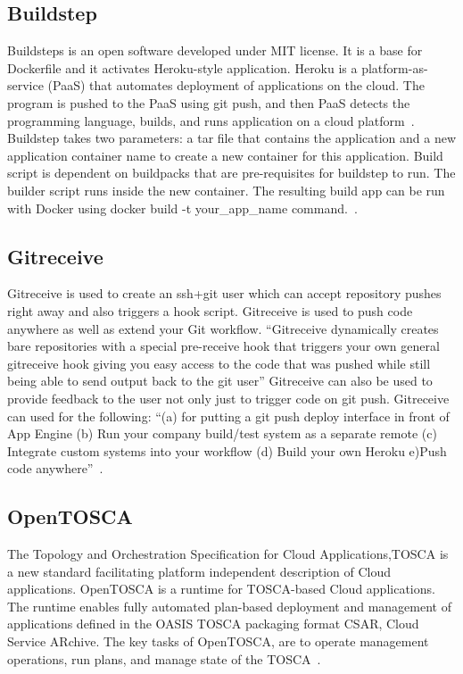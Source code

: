      \pv
     
\subsection{Buildstep}
     
Buildsteps is an open software developed under MIT license.  It is a
base for Dockerfile and it activates Heroku-style application. Heroku
is a platform-as-service (PaaS) that automates deployment of
applications on the cloud. The program is pushed to the PaaS using git
push, and then PaaS detects the programming language, builds, and runs
application on a cloud platform~\cite{plassnig15}.  Buildstep takes
two parameters: a tar file that contains the application and a new
application container name to create a new container for this
application. Build script is dependent on buildpacks that are
pre-requisites for buildstep to run. The builder script runs inside
the new container.  The resulting build app can be run with Docker
using docker build -t your\_app\_name
command.~\cite{github-buildstep}.

\subsection{Gitreceive}

Gitreceive is used to create an ssh+git user which can accept
repository pushes right away and also triggers a hook
script. Gitreceive is used to push code anywhere as well as extend
your Git workflow. ``Gitreceive dynamically creates bare repositories
with a special pre-receive hook that triggers your own general
gitreceive hook giving you easy access to the code that was pushed
while still being able to send output back to the git user''
Gitreceive can also be used to provide feedback to the user not only
just to trigger code on git push.  Gitreceive can used for the
following: ``(a) for putting a git push deploy interface in front of
App Engine (b) Run your company build/test system as a separate remote
(c) Integrate custom systems into your workflow (d) Build your own
Heroku e)Push code anywhere''~\cite{lindsay2016}.
     
\subsection{OpenTOSCA}

The Topology and Orchestration Specification for Cloud
Applications,TOSCA is a new standard facilitating platform independent
description of Cloud applications. OpenTOSCA is a runtime for
TOSCA-based Cloud applications. The runtime enables fully automated
plan-based deployment and management of applications defined in the
OASIS TOSCA packaging format CSAR, Cloud Service ARchive.  The key
tasks of OpenTOSCA, are to operate management operations, run plans,
and manage state of the TOSCA~\cite{openTOSCA-paper}.
     
